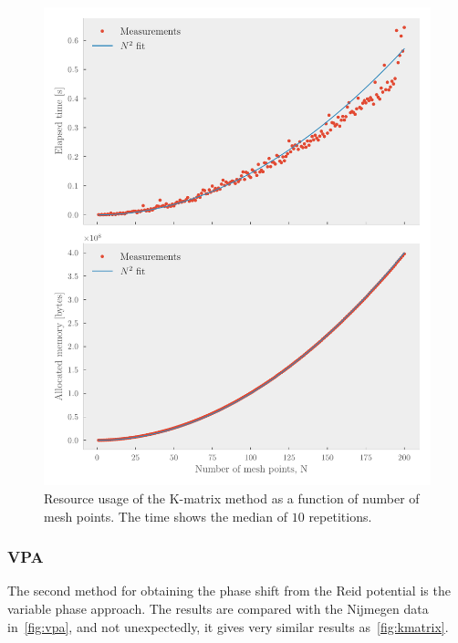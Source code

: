 \begin{figure}[ht!]
  \centering
  \includegraphics[]{Figures/kmatrix_measurements.pdf}
  \caption{\label{fig:kmatrix_measurements}Resource usage of the K-matrix
    method as a function of number of mesh points. The time shows the median of
    \(10\) repetitions.}
\end{figure}



\subsubsection{VPA}

The second method for obtaining the phase shift from the Reid potential is the
variable phase approach. The results are compared with the Nijmegen data
in~\cref{fig:vpa}, and not unexpectedly, it gives very similar results
as~\cref{fig:kmatrix}.

